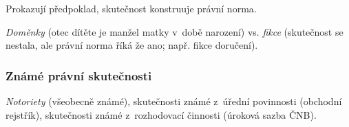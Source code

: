 Prokazují předpoklad, skutečnost konstruuje právní norma.

\emph{Doměnky} (otec dítěte je manžel matky v~době narození) vs. \emph{fikce} (skutečnost se nestala, ale právní norma říká že ano; např. fikce doručení).


\subsubsection{Známé právní skutečnosti}

\emph{Notoriety} (všeobecně známé), skutečnosti známé z~úřední povinnosti (obchodní rejstřík), skutečnosti známé z~rozhodovací činnosti (úroková sazba ČNB).
